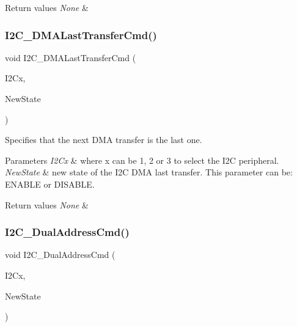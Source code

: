 \begin{DoxyRetVals}{Return values}
{\em None} & \\
\hline
\end{DoxyRetVals}
\mbox{\label{group___i2_c_gab2e994c5681eb6ec7c26a03ffe1de060}} 
\subsubsection{\texorpdfstring{I2\+C\+\_\+\+D\+M\+A\+Last\+Transfer\+Cmd()}{I2C\_DMALastTransferCmd()}}
{\footnotesize\ttfamily void I2\+C\+\_\+\+D\+M\+A\+Last\+Transfer\+Cmd (\begin{DoxyParamCaption}\item[{I2\+C\+\_\+\+Type\+Def $\ast$}]{I2\+Cx,  }\item[{Functional\+State}]{New\+State }\end{DoxyParamCaption})}



Specifies that the next D\+MA transfer is the last one. 


\begin{DoxyParams}{Parameters}
{\em I2\+Cx} & where x can be 1, 2 or 3 to select the I2C peripheral. \\
\hline
{\em New\+State} & new state of the I2C D\+MA last transfer. This parameter can be\+: E\+N\+A\+B\+LE or D\+I\+S\+A\+B\+LE. \\
\hline
\end{DoxyParams}

\begin{DoxyRetVals}{Return values}
{\em None} & \\
\hline
\end{DoxyRetVals}
\mbox{\label{group___i2_c_ga02145a333a56e79557d6ef4ea03fc313}} 
\subsubsection{\texorpdfstring{I2\+C\+\_\+\+Dual\+Address\+Cmd()}{I2C\_DualAddressCmd()}}
{\footnotesize\ttfamily void I2\+C\+\_\+\+Dual\+Address\+Cmd (\begin{DoxyParamCaption}\item[{I2\+C\+\_\+\+Type\+Def $\ast$}]{I2\+Cx,  }\item[{Functional\+State}]{New\+State }\end{DoxyParamCaption})}



